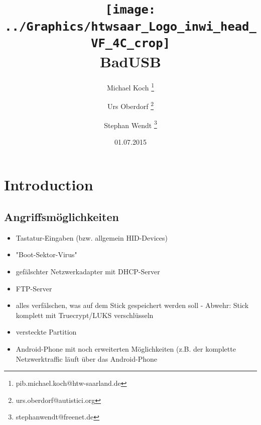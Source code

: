 \documentclass[
a4paper, %
twoside%
]{article}
\title{\texttt{[image: ../Graphics/htwsaar\_Logo\_inwi\_head\_VF\_4C\_crop]}\\ BadUSB}
\author{Michael Koch
\thanks{pib.michael.koch@htw-saarland.de}
\and{Urs Oberdorf}
\thanks{urs.oberdorf@autistici.org}
\and{Stephan Wendt}
\thanks{stephanwendt@freenet.de}}
\date{01.07.2015}
\begin{document}

\maketitle





\section{Introduction}
\subsection{Angriffsmöglichkeiten}
\begin{itemize}
\item Tastatur-Eingaben (bzw. allgemein HID-Devices)
\item "Boot-Sektor-Virus"
\item gefälschter Netzwerkadapter mit DHCP-Server
\item FTP-Server
\item alles verfälschen, was auf dem Stick gespeichert werden soll - Abwehr: Stick komplett mit Truecrypt/LUKS verschlüsseln
\item versteckte Partition
\item Android-Phone mit noch erweiterten Möglichkeiten (z.B. der komplette
	Netzwerktraffic läuft über das Android-Phone
\end{itemize}



\end{document}
